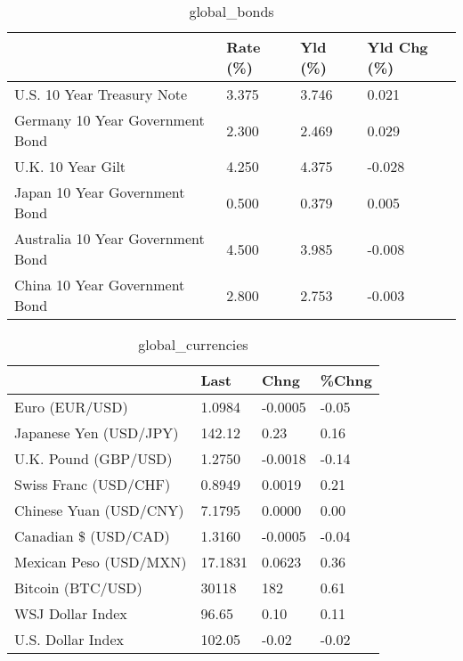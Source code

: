 \documentclass{article}%
\begin{document}
%


\begin{table}[htbp]%
\caption{global\_bonds}%
\centering%
\begin{adjustbox}{width=1\textwidth}%
\begin{tabular}{llll}
\toprule
                                  & Rate (\%) & Yld (\%) & Yld Chg (\%) \\
\midrule
       U.S. 10 Year Treasury Note &    3.375 &   3.746 &       0.021 \\
  Germany 10 Year Government Bond &    2.300 &   2.469 &       0.029 \\
                U.K. 10 Year Gilt &    4.250 &   4.375 &      -0.028 \\
    Japan 10 Year Government Bond &    0.500 &   0.379 &       0.005 \\
Australia 10 Year Government Bond &    4.500 &   3.985 &      -0.008 \\
    China 10 Year Government Bond &    2.800 &   2.753 &      -0.003 \\
\bottomrule
\end{tabular}
%
\end{adjustbox}%
\end{table}

%


\begin{table}[htbp]%
\caption{global\_currencies}%
\centering%
\begin{adjustbox}{width=1\textwidth}%
\begin{tabular}{llll}
\toprule
                       &    Last &    Chng & \%Chng \\
\midrule
        Euro (EUR/USD) &  1.0984 & -0.0005 & -0.05 \\
Japanese Yen (USD/JPY) &  142.12 &    0.23 &  0.16 \\
  U.K. Pound (GBP/USD) &  1.2750 & -0.0018 & -0.14 \\
 Swiss Franc (USD/CHF) &  0.8949 &  0.0019 &  0.21 \\
Chinese Yuan (USD/CNY) &  7.1795 &  0.0000 &  0.00 \\
  Canadian \$ (USD/CAD) &  1.3160 & -0.0005 & -0.04 \\
Mexican Peso (USD/MXN) & 17.1831 &  0.0623 &  0.36 \\
     Bitcoin (BTC/USD) &   30118 &     182 &  0.61 \\
      WSJ Dollar Index &   96.65 &    0.10 &  0.11 \\
     U.S. Dollar Index &  102.05 &   -0.02 & -0.02 \\
\bottomrule
\end{tabular}
%
\end{adjustbox}%
\end{table}
\end{document}
